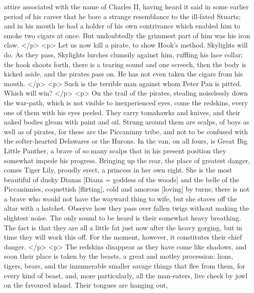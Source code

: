       attire associated with the name of Charles II, having heard it said in
      some earlier period of his career that he bore a strange resemblance to
      the ill-fated Stuarts; and in his mouth he had a holder of his own
      contrivance which enabled him to smoke two cigars at once. But undoubtedly
      the grimmest part of him was his iron claw.
    </p>
    <p>
      Let us now kill a pirate, to show Hook's method. Skylights will do. As
      they pass, Skylights lurches clumsily against him, ruffling his lace
      collar; the hook shoots forth, there is a tearing sound and one screech,
      then the body is kicked aside, and the pirates pass on. He has not even
      taken the cigars from his mouth.
    </p>
    <p>
      Such is the terrible man against whom Peter Pan is pitted. Which will win?
    </p>
    <p>
      On the trail of the pirates, stealing noiselessly down the war-path, which
      is not visible to inexperienced eyes, come the redskins, every one of them
      with his eyes peeled. They carry tomahawks and knives, and their naked
      bodies gleam with paint and oil. Strung around them are scalps, of boys as
      well as of pirates, for these are the Piccaninny tribe, and not to be
      confused with the softer-hearted Delawares or the Hurons. In the van, on
      all fours, is Great Big Little Panther, a brave of so many scalps that in
      his present position they somewhat impede his progress. Bringing up the
      rear, the place of greatest danger, comes Tiger Lily, proudly erect, a
      princess in her own right. She is the most beautiful of dusky Dianas
      [Diana = goddess of the woods] and the belle of the Piccaninnies,
      coquettish [flirting], cold and amorous [loving] by turns; there is not a
      brave who would not have the wayward thing to wife, but she staves off the
      altar with a hatchet. Observe how they pass over fallen twigs without
      making the slightest noise. The only sound to be heard is their somewhat
      heavy breathing. The fact is that they are all a little fat just now after
      the heavy gorging, but in time they will work this off. For the moment,
      however, it constitutes their chief danger.
    </p>
    <p>
      The redskins disappear as they have come like shadows, and soon their
      place is taken by the beasts, a great and motley procession: lions,
      tigers, bears, and the innumerable smaller savage things that flee from
      them, for every kind of beast, and, more particularly, all the man-eaters,
      live cheek by jowl on the favoured island. Their tongues are hanging out,
